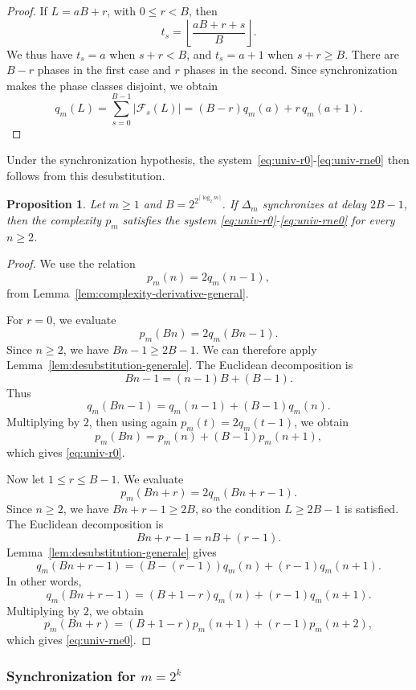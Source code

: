 \documentclass[12pt,reqno]{article}
\theoremstyle{plain}
\newtheorem{proposition}[theorem]{Proposition}
\theoremstyle{definition}
\begin{document}
\begin{proof}
If $L = aB + r$, with $0 \le r < B$, then
\[
  t_s = \left\lfloor \frac{aB + r + s}{B} \right\rfloor.
\]
We thus have $t_s = a$ when $s + r < B$, and $t_s = a+1$ when $s + r \ge B$. There are $B - r$ phases in the first case and $r$ phases in the second. Since synchronization makes the phase classes disjoint, we obtain
\[
  q_m(L) = \sum_{s=0}^{B-1} |\mathcal{F}_s(L)| = (B - r) q_m(a) + r \, q_m(a+1).
\]
\end{proof}

Under the synchronization hypothesis, the system~\eqref{eq:univ-r0}-\eqref{eq:univ-rne0} then follows from this desubstitution.

\begin{proposition}
\label{prop:dnc-conditional}
Let $m \ge 1$ and $B = 2^{2^{\lceil \log_2 m \rceil}}$. If $\Delta_m$ synchronizes at delay $2B-1$, then the complexity $p_m$ satisfies the system \eqref{eq:univ-r0}-\eqref{eq:univ-rne0} for every $n \ge 2$.
\end{proposition}

\begin{proof}
We use the relation
\[
  p_m(n) = 2 q_m(n-1),
\]
from Lemma~\ref{lem:complexity-derivative-general}.

For $r = 0$, we evaluate
\[
  p_m(Bn) = 2 q_m(Bn - 1).
\]
Since $n \ge 2$, we have $Bn - 1 \ge 2B - 1$. We can therefore apply Lemma~\ref{lem:desubstitution-generale}. The Euclidean decomposition is
\[
  Bn - 1 = (n-1) B + (B - 1).
\]
Thus
\[
  q_m(Bn - 1) = q_m(n - 1) + (B - 1) q_m(n).
\]
Multiplying by $2$, then using again $p_m(t) = 2 q_m(t-1)$, we obtain
\[
  p_m(Bn) = p_m(n) + (B - 1) p_m(n + 1),
\]
which gives \eqref{eq:univ-r0}.

Now let $1 \le r \le B - 1$. We evaluate
\[
  p_m(Bn + r) = 2 q_m(Bn + r - 1).
\]
Since $n \ge 2$, we have $Bn + r - 1 \ge 2B$, so the condition $L \ge 2B - 1$ is satisfied. The Euclidean decomposition is
\[
  Bn + r - 1 = nB + (r - 1).
\]
Lemma~\ref{lem:desubstitution-generale} gives
\[
  q_m(Bn + r - 1) = (B - (r - 1)) q_m(n) + (r - 1) q_m(n + 1).
\]
In other words,
\[
  q_m(Bn + r - 1) = (B + 1 - r) q_m(n) + (r - 1) q_m(n + 1).
\]
Multiplying by $2$, we obtain
\[
  p_m(Bn + r) = (B + 1 - r) p_m(n + 1) + (r - 1) p_m(n + 2),
\]
which gives \eqref{eq:univ-rne0}.
\end{proof}

\subsubsection{Synchronization for \texorpdfstring{$m = 2^k$}{m = powers of two}}
\end{document}
